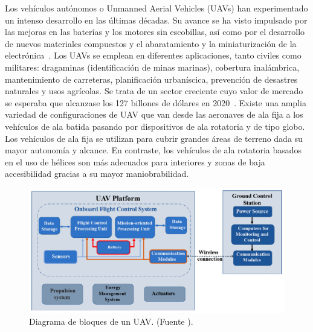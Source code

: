 \documentclass[a4paper,12pt]{book}
\begin{document}
Los vehículos autónomos o Unmanned Aerial Vehicles (UAVs) han experimentado un intenso desarrollo en las últimas décadas. Su avance se ha visto impulsado por las mejoras en las baterías y los motores sin escobillas, así como por el desarrollo de nuevos materiales compuestos y el abaratamiento y la miniaturización de la electrónica~\cite{boukoberine2019critical, hristov2016review, mazur2016clarity}. Los UAVs se emplean en diferentes aplicaciones, tanto civiles como militares: dragaminas (identificación de minas marinas), cobertura inalámbrica, mantenimiento de carreteras, planificación urbaníscica, prevención de desastres naturales y usos agrícolas. Se trata de un sector creciente cuyo valor de mercado se esperaba que alcanzase los 127 billones de dólares en 2020~\cite{mazur2016clarity}. Existe una amplia variedad de configuraciones de UAV que van desde las aeronaves de ala fija a los vehículos de ala batida pasando por dispositivos de ala rotatoria y de tipo globo. Los vehículos de ala fija se utilizan para cubrir grandes áreas de terreno dada su mayor autonomía y alcance. En contraste, los vehículos de ala rotatoria basados en el uso de hélices son más adecuados para interiores y zonas de baja accesibilidad gracias a su mayor maniobrabilidad.

\begin{figure}[!ht]
    \centering
	\includegraphics[width=0.8\linewidth]{Figures/UAV_structure.png}
 	\caption{Diagrama de bloques de un UAV. (Fuente \cite{boukoberine2019critical}).}
 	\label{fig:UAV_structure}
\end{figure}
\end{document}

